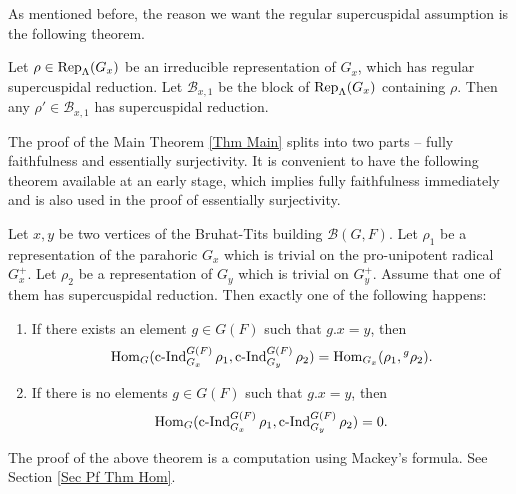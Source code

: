 		As mentioned before, the reason we want the regular supercuspidal assumption is the following theorem. 
		
		\begin{theorem}\label{Thm SC Red}
			Let $\rho \in \operatorname{\operatorname{Rep}}_{\Lambda}(G_x)$ be an irreducible representation of $G_x$, which has regular supercuspidal reduction. Let $\mathcal{B}_{x,1}$ be the block of $\operatorname{\operatorname{Rep}}_{\Lambda}(G_x)$ containing $\rho$. Then any $\rho' \in \mathcal{B}_{x,1}$ has supercuspidal reduction.
		\end{theorem}
		
		The proof of the Main Theorem \ref{Thm Main} splits into two parts -- fully faithfulness and essentially surjectivity. It is convenient to have the following theorem available at an early stage, which implies fully faithfulness immediately and is also used in the proof of essentially surjectivity.
		
		\begin{theorem}\label{Thm Hom}
			Let $x, y$ be two vertices of the Bruhat-Tits building $\mathcal{B}(G, F)$. Let $\rho_1$ be a representation of the parahoric $G_x$ which is trivial on the pro-unipotent radical $G_x^+$. Let $\rho_2$ be a representation of $G_y$ which is trivial on $G_y^+$. Assume that one of them has supercuspidal reduction. Then exactly one of the following happens:
			\begin{enumerate}
				\item If there exists an element $g \in G(F)$ such that $g.x=y$, then
				$$\operatorname{\operatorname{Hom}}_G(\operatorname{\operatorname{c-Ind}}_{G_x}^{G(F)}\rho_1, \operatorname{\operatorname{c-Ind}}_{G_y}^{G(F)}\rho_2)=\operatorname{\operatorname{Hom}}_{G_x}(\rho_1, {^g\rho_2}).$$
				\item If there is no elements $g \in G(F)$ such that $g.x=y$, then
				$$\operatorname{\operatorname{Hom}}_G(\operatorname{\operatorname{c-Ind}}_{G_x}^{G(F)}\rho_1, \operatorname{\operatorname{c-Ind}}_{G_y}^{G(F)}\rho_2)=0.$$
			\end{enumerate}
		\end{theorem}
		
		The proof of the above theorem is a computation using Mackey's formula. See Section \ref{Sec Pf Thm Hom}.
		
